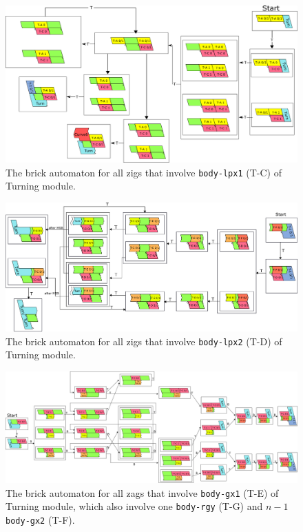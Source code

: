 \documentclass[runningheads]{llncs}
\begin{document}
\begin{figure}[ht]
\centering
\includegraphics[width=\linewidth]{Figs/Turner_BA/T-C_ver2.png}
\caption{The brick automaton for all zigs that involve \texttt{body-lpx1} (T-C) of Turning module.}
\label{fig:BA_T-C}
\end{figure}

\begin{figure}[ht]
\centering
\includegraphics[width=\linewidth]{Figs/Turner_BA/T-D_ver2.png}
\caption{The brick automaton for all zigs that involve \texttt{body-lpx2} (T-D) of Turning module.}
\label{fig:BA_T-D}
\end{figure}

\begin{figure}[ht]
\centering
\includegraphics[width=\linewidth]{Figs/Turner_BA/gx_right_ver3.png}
\caption{The brick automaton for all zags that involve \texttt{body-gx1} (T-E) of Turning module, which also involve one \texttt{body-rgy} (T-G) and $n-1$ \texttt{body-gx2} (T-F).}
\label{fig:BA_gx_right}
\end{figure}
\end{document}
